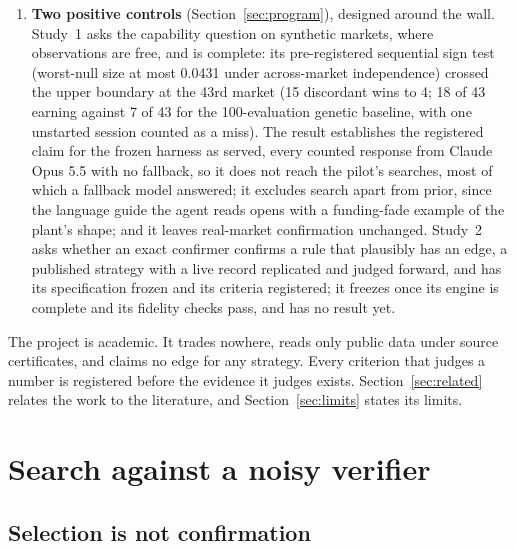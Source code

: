 \documentclass[11pt]{article}
\begin{document}
\begin{enumerate}
  \item \textbf{Two positive controls} (Section~\ref{sec:program}), designed around the wall. Study~1 asks the capability question on synthetic markets, where observations are free, and is complete: its pre-registered sequential sign test (worst-null size at most 0.0431 under across-market independence) crossed the upper boundary at the 43rd market (15 discordant wins to 4; 18 of 43 earning against 7 of 43 for the 100-evaluation genetic baseline, with one unstarted session counted as a miss). The result establishes the registered claim for the frozen harness as served, every counted response from Claude Opus 5.5 with no fallback, so it does not reach the pilot's searches, most of which a fallback model answered; it excludes search apart from prior, since the language guide the agent reads opens with a funding-fade example of the plant's shape; and it leaves real-market confirmation unchanged. Study~2 asks whether an exact confirmer confirms a rule that plausibly has an edge, a published strategy with a live record replicated and judged forward, and has its specification frozen and its criteria registered; it freezes once its engine is complete and its fidelity checks pass, and has no result yet.
\end{enumerate}
The project is academic. It trades nowhere, reads only public data under source certificates, and claims no edge for any strategy. Every criterion that judges a number is registered before the evidence it judges exists. Section~\ref{sec:related} relates the work to the literature, and Section~\ref{sec:limits} states its limits.

\section{Search against a noisy verifier}\label{sec:problem}

\subsection{Selection is not confirmation}\label{sec:selection}
\end{document}
